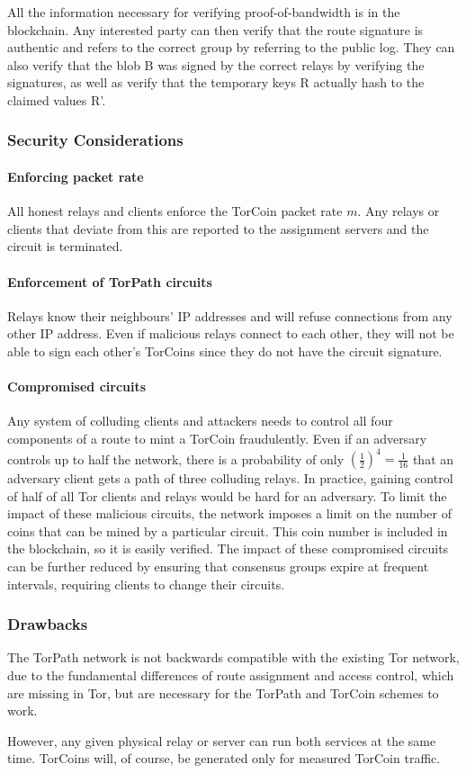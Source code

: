 All the information necessary for verifying proof-of-bandwidth is in the
blockchain. Any interested party can then verify that the route signature is
authentic and refers to the correct group by referring to the public log. They
can also verify that the blob B was signed by the correct relays by verifying
the signatures, as well as verify that the temporary keys R actually hash to
the claimed values R'.

\subsubsection{Security Considerations}

\paragraph{Enforcing packet rate} All honest relays and clients enforce the
TorCoin packet rate $m$. Any relays or clients that deviate from this are
reported to the assignment servers and the circuit is terminated.

\paragraph{Enforcement of TorPath circuits} Relays know their neighbours'
IP addresses and will refuse connections from any other IP address. Even if
malicious relays connect to each other, they will not be able to sign each
other's TorCoins since they do not have the circuit signature.

\paragraph{Compromised circuits} Any system of colluding clients and
attackers needs to control all four components of a route to mint a TorCoin
fraudulently. Even if an adversary controls up to half the network, there is a
probability of only $(\frac{1}{2})^4 = \frac{1}{16}$ that an adversary client
gets a path of three colluding relays. In practice, gaining control of half of
all Tor clients and relays would be hard for an adversary.  To limit the
impact of these malicious circuits, the network imposes a limit on the number
of coins that can be mined by a particular circuit. This coin number is
included in the blockchain, so it is easily verified. 
The impact of these
compromised circuits can be further reduced by ensuring that consensus groups
expire at frequent intervals, requiring clients to change their circuits.

\subsubsection{Drawbacks} The TorPath network is not backwards compatible with
the existing Tor network, due to the fundamental differences of route
assignment and access control, which are missing in Tor, but are necessary for
the TorPath and TorCoin schemes to work.

However, any given physical relay or server can run both services at the same
time. TorCoins will, of course, be generated only for measured TorCoin
traffic.
